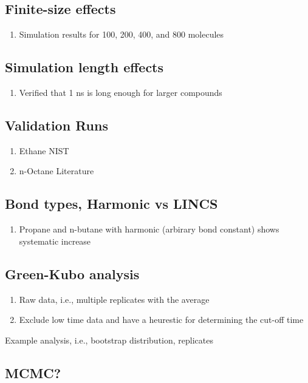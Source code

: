 \documentclass[preprint,review,12pt]{elsarticle}
\begin{document}
\subsection{Finite-size effects}

\begin{enumerate}
	\item Simulation results for 100, 200, 400, and 800 molecules
\end{enumerate}

\subsection{Simulation length effects}

\begin{enumerate}
	\item Verified that 1 ns is long enough for larger compounds
\end{enumerate}

\subsection{Validation Runs}

\begin{enumerate}
	\item Ethane NIST
	\item n-Octane Literature
\end{enumerate}

\subsection{Bond types, Harmonic vs LINCS}

\begin{enumerate}
	\item Propane and n-butane with harmonic (arbirary bond constant) shows systematic increase
\end{enumerate}

\subsection{Green-Kubo analysis}

\begin{enumerate}
	\item Raw data, i.e., multiple replicates with the average
	\item Exclude low time data and have a heurestic for determining the cut-off time
\end{enumerate}

Example analysis, i.e., bootstrap distribution, replicates

\subsection{MCMC?}



\end{document}

